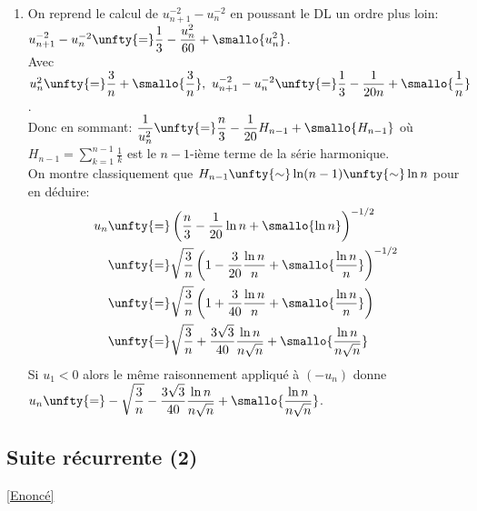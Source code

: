 \documentclass{book}
\begin{document}
\begin{enumerate}
		On en déduit $u_n\unfty{\sim}\displaystyle\displaystyle\sqrt\frac{3}{n}$. Si $u_1<0$ on a alors $u_n\unfty{\sim}-\displaystyle\displaystyle\sqrt\frac{3}{n}$.
		\item On reprend le calcul de $u_{n+1}^{-2}-u_n^{-2}$ en poussant le DL un ordre plus loin:
		$u_{n+1}^{-2}-u_n^{-2}\unfty{=}\displaystyle\frac{1}{3}-\displaystyle\frac{u_n^2}{60}+\smallo{u_n^2}$.\\
		Avec $u_n^2\unfty{=}\displaystyle\frac{3}{n}+\smallo{\displaystyle\frac{3}{n}},\ u_{n+1}^{-2}-u_n^{-2}\unfty{=}\displaystyle\frac{1}{3}-\displaystyle\frac{1}{20n}+\smallo{\displaystyle\frac{1}{n}}$.\\
		Donc en sommant: $\displaystyle\frac{1}{u_n^2}\unfty{=}\displaystyle\frac{n}{3}-\displaystyle\frac{1}{20}H_{n-1}+\smallo{H_{n-1}}$ où $H_{n-1}=\displaystyle\sum\limits_{k=1}^{n-1} \frac{1}{k}$ est le $n-1$-ième terme de la série harmonique.\\
		On montre classiquement que $H_{n-1}\unfty{\sim} \ln(n-1)\unfty{\sim}\ln n$ pour en déduire:
		\begin{align*}
			u_n&\unfty{=}\left(\displaystyle\frac{n}{3}-\displaystyle\frac{1}{20}\ln n+\smallo{\ln n}\right)^{-1/2}\\
			&\unfty{=}\displaystyle\displaystyle\sqrt{\frac{3}{n}}\left(1-\displaystyle\frac{3}{20}\displaystyle\frac{\ln n}{n}+\smallo{\displaystyle\frac{\ln n}{n}}\right)^{-1/2}\\
			&\unfty{=}\displaystyle\displaystyle\sqrt{\frac{3}{n}}\left(1+\displaystyle\frac{3}{40}\displaystyle\frac{\ln n}{n}+\smallo{\displaystyle\frac{\ln n}{n}}\right)\\
			&\unfty{=}\displaystyle\displaystyle\sqrt{\frac{3}{n}}+\displaystyle\frac{3\displaystyle\sqrt{3}}{40}\displaystyle\frac{\ln n}{n\displaystyle\sqrt{n}}+\smallo{\displaystyle\frac{\ln n}{n\displaystyle\sqrt{n}}}
		\end{align*}
		Si $u_1<0$ alors le même raisonnement appliqué à $(-u_n)$ donne $u_n\unfty{=}-\displaystyle\displaystyle\sqrt{\frac{3}{n}}-\displaystyle\frac{3\displaystyle\sqrt{3}}{40}\displaystyle\frac{\ln n}{n\displaystyle\sqrt{n}}+\smallo{\displaystyle\frac{\ln n}{n\displaystyle\sqrt{n}}}$.
	\end{enumerate}
	
	\subsection{Suite récurrente (2)}\label{sec:suite-recurrente-2}
	\textcolor{blue}{\hyperref[Suite récurrente 2]{[Enoncé]}}\\
	
\end{document}
